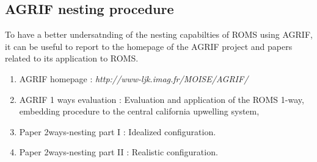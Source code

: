 \subsection{AGRIF nesting procedure}
\label{sec:2-ways-nesting}
To have a better undersatnding of the nesting capabilties of ROMS using AGRIF, it can
be useful to report to the homepage of the AGRIF project and  papers related to its
application to ROMS.
\begin{enumerate}
\item  AGRIF homepage : \textit{http://www-ljk.imag.fr/MOISE/AGRIF/}
\item  AGRIF 1 ways evaluation : Evaluation and application of the ROMS 1-way, 
embedding procedure to the central california upwelling system, \citep{Pen04}
\item  Paper 2ways-nesting part I : Idealized configuration.
\item  Paper 2ways-nesting part II : Realistic configuration.
\end{enumerate}


